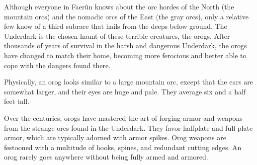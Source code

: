
Although everyone in Faerûn knows about the orc hordes of the North (the mountain orcs) and the nomadic orcs of the East (the gray orcs), only a relative few know of a third subrace that hails from the deeps below ground. The Underdark is the chosen haunt of these terrible creatures, the orogs. After thousands of years of survival in the harsh and dangerous Underdark, the orogs have changed to match their home, becoming more ferocious and better able to cope with the dangers found there.

Physically, an orog looks similar to a large mountain orc, except that the ears are somewhat larger, and their eyes are huge and pale. They average six and a half feet tall.

Over the centuries, orogs have mastered the art of forging armor and weapons from the strange ores found in the Underdark. They favor halfplate and full plate armor, which are typically adorned with armor spikes. Orog weapons are festooned with a multitude of hooks, spines, and redundant cutting edges. An orog rarely goes anywhere without being fully armed and armored.

